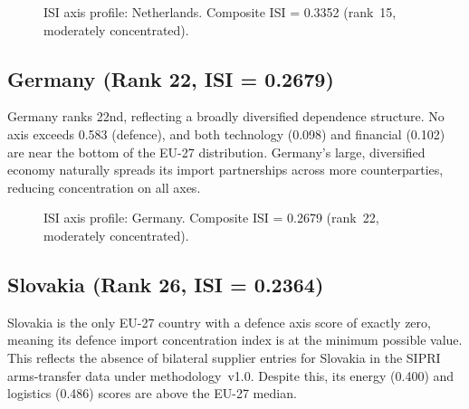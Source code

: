 \begin{figure}[htbp]
\centering

\caption{ISI axis profile: Netherlands.  Composite ISI = 0.3352
  (rank~15, moderately concentrated).}
\label{fig:radar-NL}
\end{figure}

\subsection{Germany (Rank 22, ISI = 0.2679)}

Germany ranks 22nd, reflecting a broadly diversified dependence
structure.  No axis exceeds 0.583 (defence), and both technology
(0.098) and financial (0.102) are near the bottom of the EU-27
distribution.  Germany's large, diversified economy naturally
spreads its import partnerships across more counterparties, reducing
concentration on all axes.

\begin{figure}[htbp]
\centering

\caption{ISI axis profile: Germany.  Composite ISI = 0.2679
  (rank~22, moderately concentrated).}
\label{fig:radar-DE}
\end{figure}

\subsection{Slovakia (Rank 26, ISI = 0.2364)}

Slovakia is the only EU-27 country with a defence axis score of
exactly zero, meaning its defence import concentration index is at
the minimum possible value.  This reflects the absence of bilateral
supplier entries for Slovakia in the SIPRI arms-transfer data under
methodology~v1.0.  Despite this, its energy (0.400) and
logistics (0.486) scores are above the EU-27 median.

